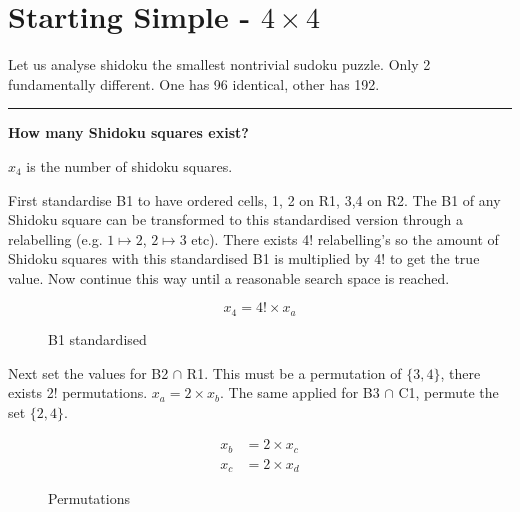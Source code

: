 \documentclass[a4paper,11pt]{report}
\newcounter{row}
\newcounter{col}
\newcounter{rowa}
\newcounter{cola}
\newcommand\setrowa[4]{
\setcounter{cola}{1}
\foreach \n in {#1, #2, #3, #4} {
\edef\x{\value{cola} - 0.5}
\edef\y{4.5 - \value{rowa}}
\node[anchor=center] at (\x, \y) {\n};
\stepcounter{cola}
}
\stepcounter{rowa}
}
\begin{document}
\section{Starting Simple - $4 \times 4$}
Let us analyse shidoku the smallest nontrivial sudoku puzzle. Only 2 fundamentally different. One has 96 identical, other has 192. 

\noindent\rule{4cm}{0.4pt}

\textbf{How many Shidoku squares exist?}

$x_4$ is the number of shidoku squares.

First standardise B1 to have ordered cells, 1, 2 on R1, 3,4 on R2. The B1 of any Shidoku square can be transformed to this standardised version through a relabelling (e.g. $1 \mapsto 2$, $2\mapsto 3$ etc). There exists 4! relabelling’s so the amount of Shidoku squares with this standardised B1 is multiplied by 4! to get the true value. Now continue this way until a reasonable search space is reached.

\begin{equation}
x_4 = 4!\times x_a
\end{equation}

\begin{figure}[h]
\centering
{}
\caption{B1 standardised}
\label{fig:shidokurelabelling}
\end{figure}

Next set the values for B2 $\cap$ R1. This must be a permutation of $\{3,4\}$, there exists 2! permutations. $x_a = 2\times x_b$. The same applied for B3 $\cap$ C1, permute the set $\{2,4\}$. 

\begin{eqnarray}x_b &= 2\times x_c\\ x_c &=2\times x_d\end{eqnarray}
\begin{figure}[h]
\centering
{}
\caption{Permutations}
\label{fig:shidokupermute}
\end{figure}
\end{document}
